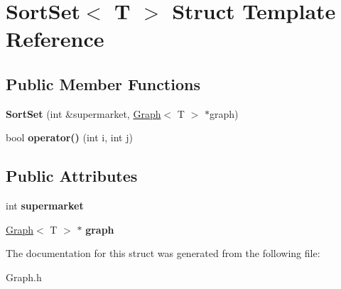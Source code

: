 \hypertarget{struct_sort_set}{}\section{Sort\+Set$<$ T $>$ Struct Template Reference}
\label{struct_sort_set}
\subsection*{Public Member Functions}
\begin{DoxyCompactItemize}
\item 
\hypertarget{struct_sort_set_a3b4ee8e3348fce81a52b4837ec6215e3}{}\label{struct_sort_set_a3b4ee8e3348fce81a52b4837ec6215e3} 
{\bfseries Sort\+Set} (int \&supermarket, \hyperlink{class_graph}{Graph}$<$ T $>$ $\ast$graph)
\item 
\hypertarget{struct_sort_set_a601b0e63cd5375a6cccbfe261cdbe124}{}\label{struct_sort_set_a601b0e63cd5375a6cccbfe261cdbe124} 
bool {\bfseries operator()} (int i, int j)
\end{DoxyCompactItemize}
\subsection*{Public Attributes}
\begin{DoxyCompactItemize}
\item 
\hypertarget{struct_sort_set_aad87701b3bc72684584c06fc7b425a45}{}\label{struct_sort_set_aad87701b3bc72684584c06fc7b425a45} 
int {\bfseries supermarket}
\item 
\hypertarget{struct_sort_set_a3f6fdba5fc78e6bbd78fb350f07ddf6a}{}\label{struct_sort_set_a3f6fdba5fc78e6bbd78fb350f07ddf6a} 
\hyperlink{class_graph}{Graph}$<$ T $>$ $\ast$ {\bfseries graph}
\end{DoxyCompactItemize}


The documentation for this struct was generated from the following file\+:\begin{DoxyCompactItemize}
\item 
Graph.\+h\end{DoxyCompactItemize}
